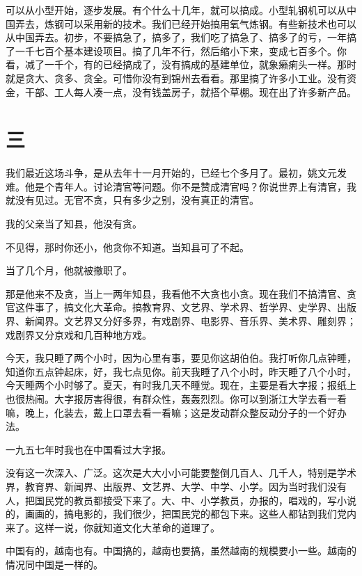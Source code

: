 可以从小型开始，逐步发展。有个什么十几年，就可以搞成。小型轧钢机可以从中国弄去，炼钢可以采用新的技术。我们已经开始搞用氧气炼钢。有些新技术也可以从中国弄去。初步，不要搞急了，搞多了，我们吃了搞急了、搞多了的亏，一年搞了一千七百个基本建设项目。搞了几年不行，然后缩小下来，变成七百多个。你看，减了一千个，有的已经搞成了，没有搞成的基建单位，就象癞痢头一样。那时就是贪大、贪多、贪全。可惜你没有到锦州去看看。那里搞了许多小工业。没有资金，干部、工人每人凑一点，没有钱盖房子，就搭个草棚。现在出了许多新产品。

\section*{三}

我们最近这场斗争，是从去年十一月开始的，已经七个多月了。最初，姚文元发难。他是个青年人。讨论清官等问题。你不是赞成清官吗？你说世界上有清官，我就没有见过。无官不贪，只有多少之别，没有真正的清官。

我的父亲当了知县，他没有贪。

不见得，那时你还小，他贪你不知道。当知县可了不起。

当了几个月，他就被撤职了。

那是他来不及贪，当上一两年知县，我看他不大贪也小贪。现在我们不搞清官、贪官这件事了，搞文化大革命。搞教育界、文艺界、学术界、哲学界、史学界、出版界、新闻界。文艺界又分好多界，有戏剧界、电影界、音乐界、美术界、雕刻界；戏剧界又分京戏和几百种地方戏。

今天，我只睡了两个小时，因为心里有事，要见你这胡伯伯。我打听你几点钟睡，知道你五点钟起床，好，我七点见你。前天我睡了八个小时，昨天睡了八个小时，今天睡两个小时够了。夏天，有时我几天不睡觉。现在，主要是看大字报；报纸上也很热闹。大字报厉害得很，有群众性，轰轰烈烈。你可以到浙江大学去看一看嘛，晚上，化装去，戴上口罩去看一看嘛；这是发动群众整反动分子的一个好办法。

一九五七年时我也在中国看过大字报。

没有这一次深入、广泛。这次是大大小小可能要整倒几百人、几千人，特别是学术界，教育界、新闻界、出版界、文艺界、大学、中学、小学。因为当时我们没有人，把国民党的教员都接受下来了。大、中、小学教员，办报的，唱戏的，写小说的，画画的，搞电影的，我们很少，把国民党的都包下来。这些人都钻到我们党内来了。这样一说，你就知道文化大革命的道理了。

中国有的，越南也有。中国搞的，越南也要搞，虽然越南的规模要小一些。越南的情况同中国是一样的。


